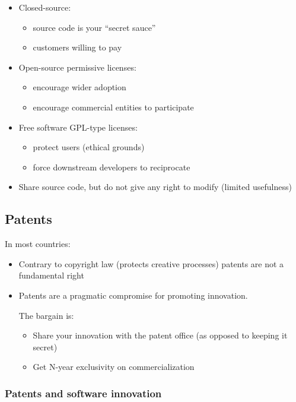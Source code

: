 \documentclass[12pt]{article}
\begin{document}
\begin{itemize}
  \item Closed-source:
  \begin{itemize}
    \item source code is your ``secret sauce''
    \item customers willing to pay
  \end{itemize}
  
  \item Open-source permissive licenses:
  \begin{itemize}
    \item encourage wider adoption
    \item encourage commercial entities to participate
  \end{itemize}
  
  \item Free software GPL-type licenses:
  \begin{itemize}
    \item protect users (ethical grounds)
    \item force downstream developers to reciprocate
  \end{itemize}
  
  \item Share source code, but do not give any right to modify (limited usefulness)
\end{itemize}

\subsection{Patents}

\noindent In most countries:
\begin{itemize}
  \item Contrary to copyright law (protects creative processes) patents are not a fundamental right
  \item Patents are a pragmatic compromise for promoting innovation.
  
  \noindent The bargain is:
  \begin{itemize}
    \item Share your innovation with the patent office (as opposed to keeping it secret)
    \item Get N-year exclusivity on commercialization
  \end{itemize}
\end{itemize}

\subsubsection{Patents and software innovation}
\end{document}
